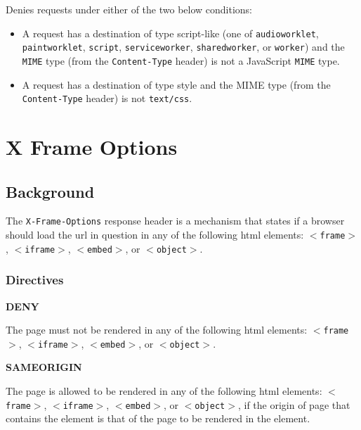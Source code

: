 \documentclass{mscreport}
\begin{document}
\vspace{0.3cm} \noindent
Denies requests under either of the two below conditions:

\begin{itemize}
  \setlength\itemsep{0.1em}
  \item A request has a destination of type script-like (one of \texttt{audioworklet}, \texttt{paintworklet}, \texttt{script}, \texttt{serviceworker}, \texttt{sharedworker}, or \texttt{worker}) and the \texttt{MIME} type (from the \texttt{Content-Type} header) is not a JavaScript \texttt{MIME} type.
  \item A request has a destination of type style and the MIME type (from the \texttt{Content-Type} header) is not \texttt{text/css}.
\end{itemize}

\clearpage
\newpage

\section{X Frame Options}
\label{section:xfo}

\subsection{Background}

The \texttt{X-Frame-Options} response header is a mechanism that states if a browser should load the url in question in any of the following html elements: \texttt{$<$frame$>$}, \texttt{$<$iframe$>$}, \texttt{$<$embed$>$}, or \texttt{$<$object$>$}.

\subsubsection{Directives}

\textbf{DENY}

\vspace{0.3cm} \noindent
The page must not be rendered in any of the following html elements: \texttt{$<$frame$>$}, \texttt{$<$iframe$>$}, \texttt{$<$embed$>$}, or \texttt{$<$object$>$}.

\vspace{0.7cm} \noindent
\textbf{SAMEORIGIN}

\vspace{0.3cm} \noindent
The page is allowed to be rendered in any of the following html elements: \texttt{$<$frame$>$}, \texttt{$<$iframe$>$}, \texttt{$<$embed$>$}, or \texttt{$<$object$>$}, if the origin of page that contains the element is that of the page to be rendered in the element.
\end{document}
